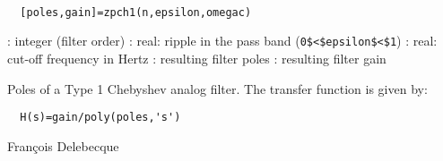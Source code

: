 
\begin{mandesc}
   \\ %
\end{mandesc}
\begin{calling_sequence}
\begin{verbatim}
  [poles,gain]=zpch1(n,epsilon,omegac)  
\end{verbatim}
\end{calling_sequence}
\begin{parameters}
  \begin{varlist}
    : integer (filter order)
    : real: ripple in the pass band (\verb!0$<$epsilon$<$1!)
    : real: cut-off frequency in Hertz
    : resulting filter poles
    : resulting filter gain
  \end{varlist}
\end{parameters}
\begin{mandescription}
  Poles of a Type 1 Chebyshev analog filter. The transfer function is given by:
\begin{verbatim}
  H(s)=gain/poly(poles,'s')
\end{verbatim}
\end{mandescription}
\begin{authors}
  Fran\c{c}ois Delebecque  
\end{authors}
